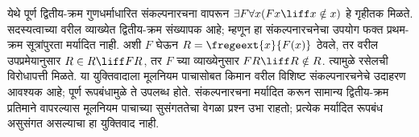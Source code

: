 येथे पूर्ण द्वितीय-क्रम गुणधर्माधारित संकल्पनारचना
वापरून $\exists F\forall x(Fx\liff x\notin x)$ हे गृहीतक मिळते.
सदस्यत्वाच्या वरील व्याख्येत द्वितीय-क्रम संख्यापक आहे;
म्हणून हा संकल्पनारचनेचा उपयोग फक्त प्रथम-क्रम सूत्रांपुरता मर्यादित नाही.
अशी $F$ घेऊन $R=\fregeext{x}{F(x)}$ ठेवले, तर
वरील उपप्रमेयानुसार $R\in R\liff FR$, तर $F$ च्या व्याख्येनुसार
$FR\liff R\notin R$. त्यामुळे रसेलची विरोधापत्ती मिळते.
या युक्तिवादाला मूलनियम पाचासोबत किमान
वरील विशिष्ट संकल्पनारचनेचे उदाहरण आवश्यक आहे;
पूर्ण रूपबंधामुळे ते उपलब्ध होते.
संकल्पनारचना मर्यादित करून सामान्य द्वितीय-क्रम प्रतिमाने वापरल्यास
मूलनियम पाचाच्या सुसंगततेचा वेगळा प्रश्न उभा राहतो;
प्रत्येक मर्यादित रूपबंध असुसंगत असल्याचा हा युक्तिवाद नाही.



